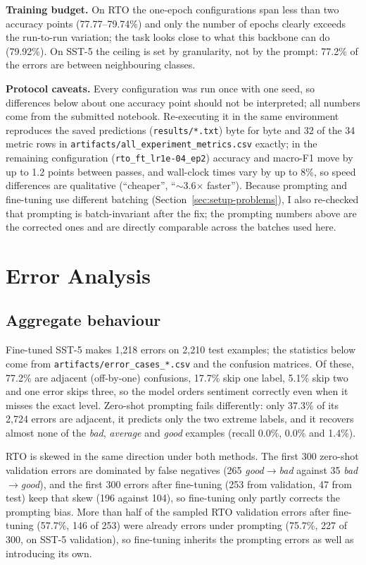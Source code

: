 \documentclass[11pt]{article}
\begin{document}
\textbf{Training budget.} On RTO the one-epoch configurations span less than two accuracy
points (77.77--79.74\%) and only the number of epochs clearly exceeds the run-to-run variation;
the task looks close to what this backbone can do (79.92\%). On SST-5 the ceiling is set by
granularity, not by the prompt: 77.2\% of the errors are between neighbouring classes.

\textbf{Protocol caveats.} Every configuration was run once with one seed, so differences below
about one accuracy point should not be interpreted; all numbers come from the submitted
notebook. Re-executing it in
the same environment reproduces the saved predictions (\texttt{results/*.txt}) byte for byte and
32 of the 34 metric rows in \texttt{artifacts/all\_experiment\_metrics.csv} exactly; in the
remaining configuration (\texttt{rto\_ft\_lr1e-04\_ep2}) accuracy and macro-F1 move by up to 1.2
points between passes, and wall-clock times vary by up to 8\%, so speed differences are
qualitative (``cheaper'', ``$\sim$3.6$\times$ faster'').
\label{sec:caveats} Because prompting and fine-tuning use different batching
(Section~\ref{sec:setup-problems}), I also re-checked that prompting is batch-invariant after the
fix; the prompting numbers above are the corrected ones and are directly comparable across the
batches used here.

\section{Error Analysis}

\subsection{Aggregate behaviour}
Fine-tuned SST-5 makes 1{,}218 errors on 2{,}210 test examples; the statistics below come from
\texttt{artifacts/error\_cases\_*.csv} and the confusion matrices. Of these, 77.2\% are adjacent
(off-by-one) confusions, 17.7\% skip one label, 5.1\% skip two and one error skips three, so the
model orders sentiment correctly even when it misses the exact level. Zero-shot prompting fails
differently: only 37.3\% of its 2{,}724 errors are adjacent, it predicts only the two extreme
labels, and it recovers almost none of the \emph{bad}, \emph{average} and \emph{good} examples
(recall 0.0\%, 0.0\% and 1.4\%).

RTO is skewed in the same direction under both methods. The first 300 zero-shot validation
errors are dominated by false negatives (265 \emph{good}$\rightarrow$\emph{bad} against 35
\emph{bad}$\rightarrow$\emph{good}), and the first 300 errors after fine-tuning (253 from
validation, 47 from test) keep that skew (196 against 104), so fine-tuning only partly corrects
the prompting bias. More than half of the sampled RTO validation errors after fine-tuning
(57.7\%, 146 of 253) were already errors under prompting (75.7\%, 227 of 300, on SST-5
validation), so fine-tuning inherits the prompting errors as well as introducing its own.
\end{document}
